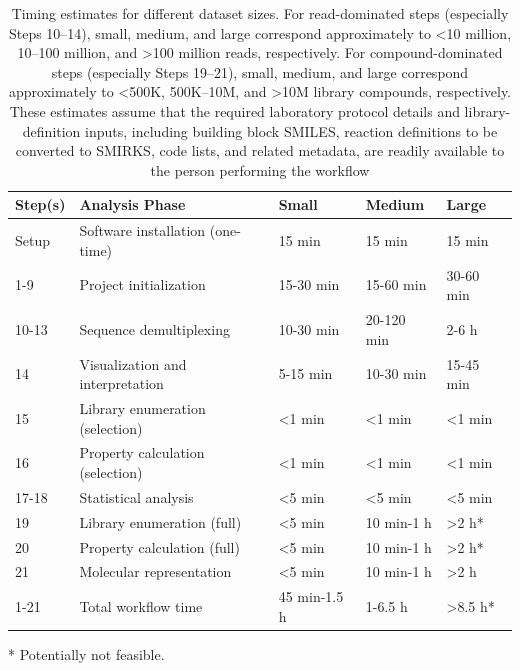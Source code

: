 \documentclass[pdflatex,sn-nature]{sn-jnl}
\begin{document}
\begin{table}[htbp]
\centering
\caption{Timing estimates for different dataset sizes. For read-dominated steps (especially Steps 10--14), small, medium, and large correspond approximately to \textless{}10 million, 10--100 million, and \textgreater{}100 million reads, respectively. For compound-dominated steps (especially Steps 19--21), small, medium, and large correspond approximately to \textless{}500K, 500K--10M, and \textgreater{}10M library compounds, respectively. These estimates assume that the required laboratory protocol details and library-definition inputs, including building block SMILES, reaction definitions to be converted to SMIRKS, code lists, and related metadata, are readily available to the person performing the workflow}
\label{tab:table14}
\begin{tabular}{p{1.7cm}p{4.4cm}p{2.0cm}p{2.0cm}p{2.0cm}}
\toprule
Step(s) & Analysis Phase & Small & Medium & Large \\
\midrule
Setup & Software installation (one-time) & 15 min & 15 min & 15 min \\
1-9 & Project initialization & 15-30 min & 15-60 min & 30-60 min \\
10-13 & Sequence demultiplexing & 10-30 min & 20-120 min & 2-6 h \\
14 & Visualization and interpretation & 5-15 min & 10-30 min & 15-45 min \\
15 & Library enumeration (selection) & \textless{}1 min & \textless{}1 min & \textless{}1 min \\
16 & Property calculation (selection) & \textless{}1 min & \textless{}1 min & \textless{}1 min \\
17-18 & Statistical analysis & \textless{}5 min & \textless{}5 min & \textless{}5 min \\
19 & Library enumeration (full) & \textless{}5 min & 10 min-1 h & \textgreater{}2 h* \\
20 & Property calculation (full) & \textless{}5 min & 10 min-1 h & \textgreater{}2 h* \\
21 & Molecular representation & \textless{}5 min & 10 min-1 h & \textgreater{}2 h \\
1-21 & Total workflow time & 45 min-1.5 h & 1-6.5 h & \textgreater{}8.5 h* \\
\bottomrule
\end{tabular}
\par\smallskip
\begin{minipage}{\textwidth}
\footnotesize
* Potentially not feasible.
\end{minipage}
\end{table}
\end{document}
